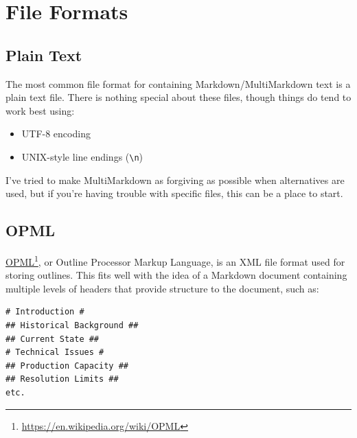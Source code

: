 
\def\mytitle{MultiMarkdown File Formats}
\def\myauthor{Fletcher T. Penney}
\def\revised{2018-10-10}




\tableofcontents

\chapter{File Formats}
\label{fileformats}

\section{Plain Text}
\label{plaintext}

The most common file format for containing Markdown\slash MultiMarkdown text is a plain text file. There is nothing special about these files, though things do tend to work best using:

\begin{itemize}
\item UTF-8 encoding

\item UNIX-style line endings (\texttt{\textbackslash{}n})

\end{itemize}

I've tried to make MultiMarkdown as forgiving as possible when alternatives are used, but if you're having trouble with specific files, this can be a place to start.

\section{OPML}
\label{opml}

\href{https://en.wikipedia.org/wiki/OPML}{OPML}\footnote{\href{https://en.wikipedia.org/wiki/OPML}{https:\slash \slash en.wikipedia.org\slash wiki\slash OPML}}, or Outline Processor Markup Language, is an XML file format used for storing outlines. This fits well with the idea of a Markdown document containing multiple levels of headers that provide structure to the document, such as:

\begin{verbatim}
# Introduction #
## Historical Background ##
## Current State ##
# Technical Issues #
## Production Capacity ##
## Resolution Limits ##
etc.
\end{verbatim}

